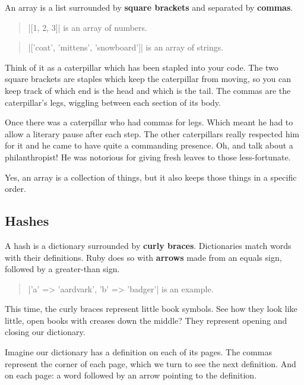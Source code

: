 \documentclass[12pt,twoside]{report}
\begin{document}
An array is a list surrounded by {\bf square brackets} and separated
by {\bf commas}.

\begin{quote}
\rubyinline|[1, 2, 3]| is an array of
numbers.\end{quote}


\begin{quote}
\rubyinline|['coat', 'mittens', 'snowboard']| is an
array of strings.\end{quote}


Think of it as a caterpillar which has been stapled into your code.
The two square brackets are staples which keep the caterpillar from
moving, so you can keep track of which end is the head and which is
the tail.  The commas are the caterpillar's legs, wiggling between
each section of its body.

Once there was a caterpillar who had commas for legs.  Which meant he
had to allow a literary pause after each step.  The other caterpillars
really respected him for it and he came to have quite a commanding
presence.  Oh, and talk about a philanthropist!  He was notorious for
giving fresh leaves to those less-fortunate.

Yes, an array is a collection of things, but it also keeps those
things in a specific order.




\subsection{Hashes}



A hash is a dictionary surrounded by {\bf curly braces}.  Dictionaries
match words with their definitions.  Ruby does so with {\bf arrows}
made from an equals sign, followed by a greater-than sign.

\begin{quote}
\rubyinline|{'a' => 'aardvark', 'b' => 'badger'}| is
an example.\end{quote}


This time, the curly braces represent little book symbols.  See how
they look like little, open books with creases down the middle?  They
represent opening and closing our dictionary.

Imagine our dictionary has a definition on each of its pages.  The
commas represent the corner of each page, which we turn to see the
next definition.  And on each page: a word followed by an arrow
pointing to the definition.
\end{document}
